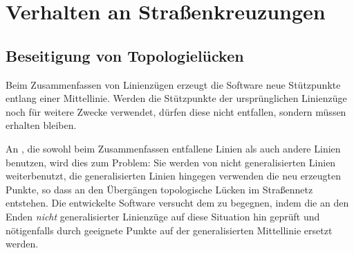 \documentclass[../main/thesis.tex]{subfiles}
\begin{document}
\section{Verhalten an Straßenkreuzungen}
\label{ch:result-junctions}

\subsection{Beseitigung von Topologielücken}
\label{ch:relocateGeneralisedNodes}

Beim Zusammenfassen von Linienzügen erzeugt die Software neue Stützpunkte entlang einer Mittellinie.
Werden die Stützpunkte der ursprünglichen Linienzüge noch für weitere Zwecke verwendet, dürfen diese nicht entfallen, sondern müssen erhalten bleiben.

An , die sowohl beim Zusammenfassen entfallene Linien als auch andere Linien benutzen, wird dies zum Problem:
Sie werden von nicht generalisierten Linien weiterbenutzt, die generalisierten Linien hingegen verwenden die neu erzeugten Punkte, so dass an den Übergängen topologische Lücken im Straßennetz entstehen.
Die entwickelte Software versucht dem zu begegnen, indem die  an den Enden \emph{nicht} generalisierter Linienzüge auf diese Situation hin geprüft und nötigenfalls durch geeignete Punkte auf der generalisierten Mittellinie ersetzt werden.

\end{document}
